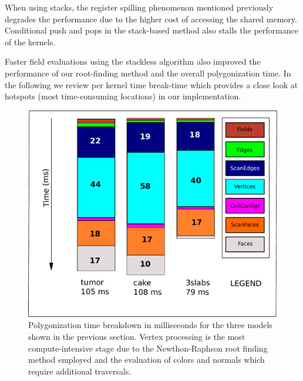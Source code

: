 When using stacks, the register spilling phenomenon mentioned previously degrades the performance due to the higher cost of accessing 
the shared memory. Conditional push and pops in the stack-based method also stalls the performance of the kernels.  

Faster field evaluations using the stackless algorithm also improved the performance of our root-finding method and the overall
polygonization time. In the following we review per kernel time break-time which provides a close look at hotspots (most time-consuming 
locations) in our implementation. 


\begin{figure}[H]
  \centering
  \includegraphics[width=0.8\linewidth]{figures/gpupoly/breakdownpoly.pdf}
  \caption{\label{fig:breakdownpoly}
  {Polygonization time breakdown in milliseconds for the three models shown in the previous section. Vertex processing is the most compute-intensive
  stage due to the Newthon-Raphson root finding method employed and the evaluation of colors and normals which require additional traversals.
  }
}
\end{figure}

